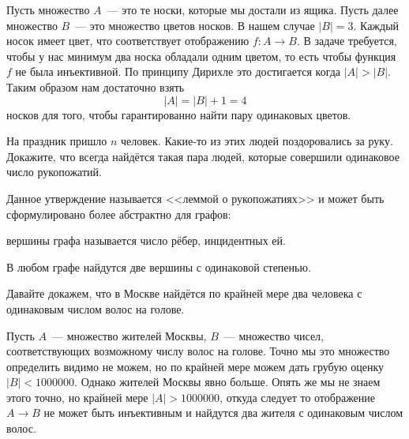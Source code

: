 Пусть множество $A$~--- это те носки, которые мы достали из ящика. Пусть далее множество $B$~--- это множество цветов носков. В нашем случае $|B|=3$. Каждый носок имеет цвет, что соответствует отображению $f:A\to B$. В задаче требуется, чтобы у нас минимум два носка обладали одним цветом, то есть чтобы функция $f$ не была инъективной. По принципу Дирихле это достигается когда $|A|>|B|$. Таким образом нам достаточно взять $$|A|=|B|+1 = 4$$ носков для того, чтобы гарантированно найти пару одинаковых цветов.

\begin{exercise}
На праздник пришло $n$ человек. Какие-то из этих людей поздоровались за руку. Докажите, что всегда найдётся такая пара людей, которые совершили одинаковое число рукопожатий.
\end{exercise}

Данное утверждение называется <<леммой о рукопожатиях>> и может быть сформулировано более абстрактно для графов:

\begin{definition}
 вершины графа называется число рёбер, инцидентных ей.
\end{definition}

\begin{HandshakesLemma}
В любом графе найдутся две вершины с одинаковой степенью.
\end{HandshakesLemma}

\begin{example}
Давайте докажем, что в Москве найдётся по крайней мере два человека с одинаковым числом волос на голове.

Пусть $A$~--- множество жителей Москвы, $B$~--- множество чисел, соответствующих возможному числу волос на голове. Точно мы это множество определить видимо не можем, но по крайней мере можем дать грубую оценку $|B|<1000000$. Однако жителей Москвы явно больше. Опять же мы не знаем этого точно, но крайней мере $|A|>1000000$, откуда следует то отображение $A\to B$ не может быть инъективным и найдутся два жителя с одинаковым числом волос.
\end{example}

